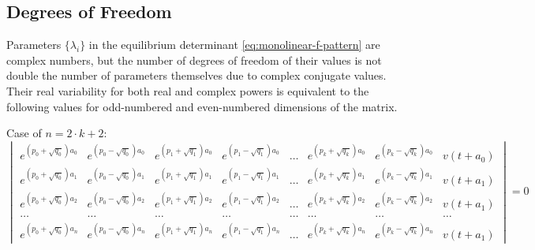 \documentclass[a4paper, 11pt, oneside]{book}
\begin{document}
\subsection{Degrees of Freedom}
Parameters $\{\lambda_i\}$ in the equilibrium determinant \ref{eq:monolinear-f-pattern} are complex numbers, but the number of degrees of freedom of their values is not double the number of parameters themselves due to complex conjugate values. Their real variability for both real and complex powers is equivalent to the following values for odd-numbered and even-numbered dimensions of the matrix.

Case of $n = 2 \cdot k + 2$:
\begin{equation}\label{eq:monolinear-f-pattern-2k-degrees-of-freedom}
  \begin{vmatrix}
    \displaystyle e^{(p_0+\sqrt{q_0})a_0} & e^{(p_0-\sqrt{q_0})a_0} & e^{(p_1+\sqrt{q_1})a_0} & e^{(p_1-\sqrt{q_1})a_0} & \ldots & e^{(p_k+\sqrt{q_k})a_0} & e^{(p_k-\sqrt{q_k})a_0} & v(t+a_0) \\
    \displaystyle e^{(p_0+\sqrt{q_0})a_1} & e^{(p_0-\sqrt{q_0})a_1} & e^{(p_1+\sqrt{q_1})a_1} & e^{(p_1-\sqrt{q_1})a_1} & \ldots & e^{(p_k+\sqrt{q_k})a_1} & e^{(p_k-\sqrt{q_k})a_1} & v(t+a_1) \\
    \displaystyle e^{(p_0+\sqrt{q_0})a_2} & e^{(p_0-\sqrt{q_0})a_2} & e^{(p_1+\sqrt{q_1})a_2} & e^{(p_1-\sqrt{q_1})a_2} & \ldots & e^{(p_k+\sqrt{q_k})a_2} & e^{(p_k-\sqrt{q_k})a_2} & v(t+a_1) \\
    \ldots & \ldots & \ldots & \ldots & \ldots & \ldots & \ldots & \ldots \\
    \displaystyle e^{(p_0+\sqrt{q_0})a_n} & e^{(p_0-\sqrt{q_0})a_n} & e^{(p_1+\sqrt{q_1})a_n} & e^{(p_1-\sqrt{q_1})a_n} & \ldots & e^{(p_k+\sqrt{q_k})a_n} & e^{(p_k-\sqrt{q_k})a_n} & v(t+a_1)
  \end{vmatrix}
  =0
\end{equation}
\end{document}
